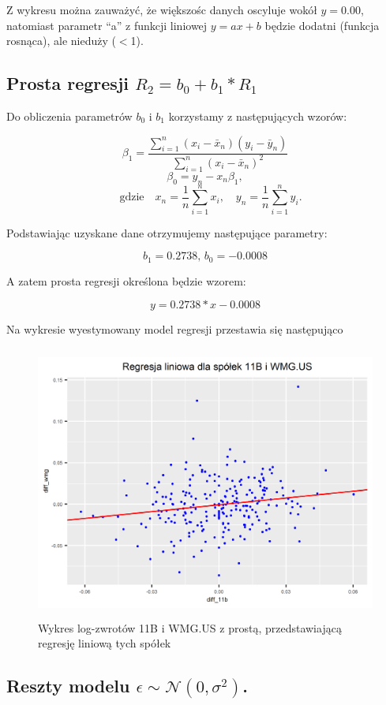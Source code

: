 \documentclass[a4paper,11pt]{article}
\begin{document}
Z wykresu można zauważyć, że większośc danych oscyluje wokół \(y=0.00\), natomiast parametr “a” z funkcji liniowej \(y=ax+b\) będzie dodatni (funkcja rosnąca), ale nieduży (\(<\)1).


\subsection{Prosta regresji \(R_2 = b_0 + b_1 * R_1\)}
Do obliczenia parametrów \(b_0\) i \(b_1\) korzystamy z następujących wzorów:

\[
\beta_1 = \frac{\sum_{i=1}^{n} (x_i - \bar{x}_n)(y_i - \bar{y}_n)}{\sum_{i=1}^{n} (x_i - \bar{x}_n)^2}
\]
\[
\beta_0 = y_n - x_n \beta_1,
\]
\[
\quad \text{gdzie} \quad x_n = \frac{1}{n} \sum_{i=1}^{n} x_i, \quad y_n = \frac{1}{n} \sum_{i=1}^{n} y_i.
\]

Podstawiając uzyskane dane otrzymujemy następujące parametry:

\[b_1 = 0.2738 \text{, }b_0 = -0.0008\]

A zatem prosta regresji określona będzie wzorem:

\[y = 0.2738 * x - 0.0008\]

\newpage

Na wykresie wyestymowany model regresji przestawia się następująco

\begin{figure}[h]
\centering
\includegraphics[width=12cm, height=9cm]{img/reg_regresja.png}
\caption{Wykres log-zwrotów 11B i WMG.US z prostą, przedstawiającą regresję liniową tych spółek}
\end{figure}


\subsection{Reszty modelu \(\epsilon \sim \mathcal{N}(0, \sigma^2)\).}
\end{document}
